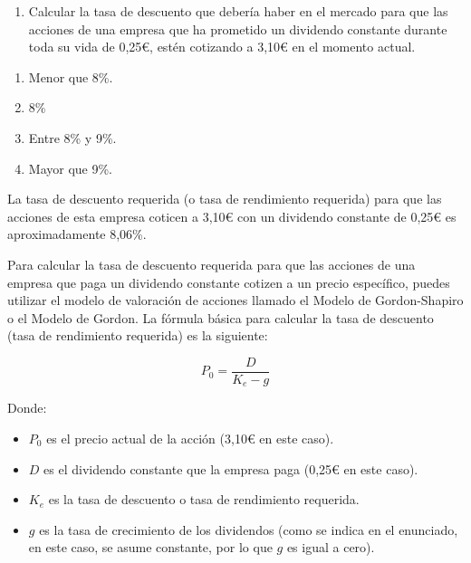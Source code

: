 \documentclass[
  letterpaper,
  DIV=11,
  numbers=noendperiod]{scrreprt}
\providecommand{\tightlist}{%
  \setlength{\itemsep}{0pt}\setlength{\parskip}{0pt}}\usepackage{longtable,booktabs,array}
\begin{document}
\begin{tcolorbox}
\begin{enumerate}
\def\labelenumi{\arabic{enumi}.}
\tightlist
\item
  Calcular la tasa de descuento que debería haber en el mercado para que
  las acciones de una empresa que ha prometido un dividendo constante
  durante toda su vida de 0,25€, estén cotizando a 3,10€ en el momento
  actual.
\end{enumerate}

\begin{enumerate}
\def\labelenumi{\alph{enumi}.}
\item
  Menor que 8\%.
\item
  8\%
\item
  Entre 8\% y 9\%.
\item
  Mayor que 9\%.
\end{enumerate}

\begin{tcolorbox}[enhanced jigsaw, toprule=.15mm, left=2mm, breakable, opacitybacktitle=0.6, toptitle=1mm, coltitle=black, arc=.35mm, leftrule=.75mm, bottomtitle=1mm, titlerule=0mm, title=\textcolor{quarto-callout-tip-color}{\faLightbulb}\hspace{0.5em}{Solución}, rightrule=.15mm, opacityback=0, bottomrule=.15mm, colback=white, colframe=quarto-callout-tip-color-frame, colbacktitle=quarto-callout-tip-color!10!white]

La tasa de descuento requerida (o tasa de rendimiento requerida) para
que las acciones de esta empresa coticen a 3,10€ con un dividendo
constante de 0,25€ es aproximadamente 8,06\%.

Para calcular la tasa de descuento requerida para que las acciones de
una empresa que paga un dividendo constante cotizen a un precio
específico, puedes utilizar el modelo de valoración de acciones llamado
el Modelo de Gordon-Shapiro o el Modelo de Gordon. La fórmula básica
para calcular la tasa de descuento (tasa de rendimiento requerida) es la
siguiente:

\[P_0 = \frac{D} {K_e - g}\]

Donde:

\begin{itemize}
\item
  \(P_0\) es el precio actual de la acción (3,10€ en este caso).
\item
  \(D\) es el dividendo constante que la empresa paga (0,25€ en este
  caso).
\item
  \(K_e\) es la tasa de descuento o tasa de rendimiento requerida.
\item
  \(g\) es la tasa de crecimiento de los dividendos (como se indica en
  el enunciado, en este caso, se asume constante, por lo que \(g\) es
  igual a cero).
\end{itemize}


\end{tcolorbox}
\end{tcolorbox}
\end{document}
